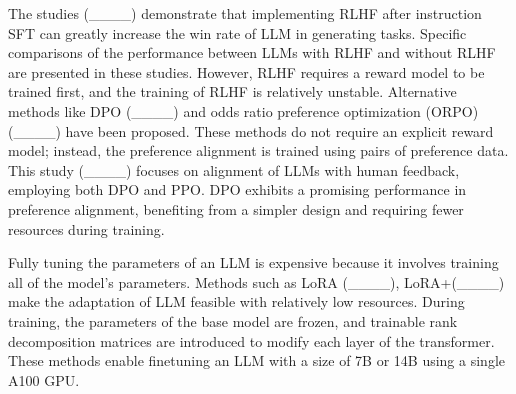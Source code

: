 The studies (____) demonstrate that implementing RLHF after instruction SFT can greatly increase the win rate of LLM in generating tasks. Specific comparisons of the performance between LLMs with RLHF and without RLHF are presented in these studies. However, RLHF requires a reward model to be trained first, and the training of RLHF is relatively unstable. Alternative methods like DPO (____) and odds ratio preference optimization (ORPO) (____) have been proposed. These methods do not require an explicit reward model; instead, the preference alignment is trained using pairs of preference data. This study (____) focuses on alignment of LLMs with human feedback, employing both DPO and PPO. DPO exhibits a promising performance in preference alignment, benefiting from a simpler design and requiring fewer resources during training.

Fully tuning the parameters of an LLM is expensive because it involves training all of the model's parameters. Methods such as LoRA (____), LoRA+(____) make the adaptation of LLM feasible with relatively low resources. During training, the parameters of the base model are frozen,  and trainable rank decomposition matrices are introduced to modify each layer of the transformer. These methods enable finetuning an LLM with a size of 7B or 14B using a single A100 GPU.